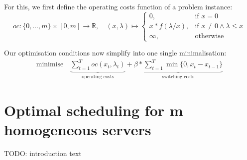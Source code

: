 \documentclass[hidelinks]{article}
\theoremstyle{plain}
\theoremstyle{definition}
\newtheorem{defn}[thm]{Definition}
\theoremstyle{rem}
\newcommand{\mx}{\mathcal{X}}
\newcommand{\fromto}[2]{\{#1,\ldots,#2\}}
\begin{document}
For this, we first define the operating costs function of a problem instance:
\begin{equation*}
	oc:\fromto{0}{m}\times[0,m]\rightarrow\mathbb{R},\quad(x,\lambda)\mapsto\begin{cases}
          0, & \text{if $x=0$}\\
	  x*f(\lambda/x), & \text{if $x\ne 0\land\lambda\le x$}\\
	  \infty, & \text{otherwise}
	  \end{cases} \label{fct:c}
\end{equation*}

Our optimisation conditions now simplify into one single minimalisation:
\begin{align*}
	\text{minimise}\quad\underbrace{\sum\limits_{t=1}^{T}oc(x_t,\lambda_t)}_{\text{operating costs}}+\underbrace{\beta*\sum\limits_{t=1}^{T}\min\{0,x_t-x_{t-1}\}}_{\text{switching costs}}
\end{align*}


\section{Optimal scheduling for m homogeneous servers}\label{sec:opt}
TODO: introduction text
\end{document}

